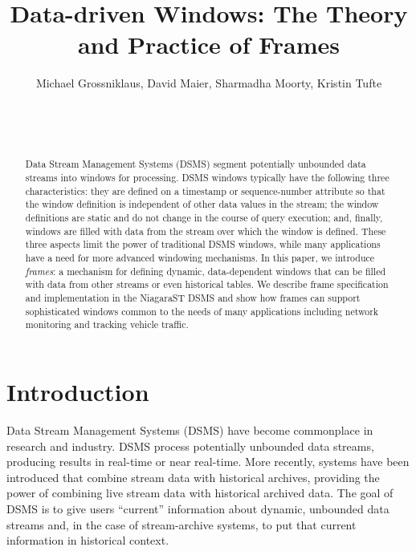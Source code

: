 \documentclass{vldb}
\newcommand{\dquote}[1]{``#1''}
\begin{document}
\thispagestyle{empty}
\pagestyle{empty}

\title{Data-driven Windows: The Theory and Practice of Frames}


\author{%
\alignauthor
Michael Grossniklaus, David Maier, Sharmadha Moorty, Kristin Tufte\\
       \\
       \\
       \\
}



\maketitle

\begin{abstract}
Data Stream Management Systems (DSMS) segment potentially unbounded data streams into windows for processing. DSMS windows typically have the following three characteristics: they are defined on a timestamp or sequence-number attribute so that the window definition is independent of other data values in the stream; the window definitions are static and do not change in the course of query execution; and, finally, windows are filled with data from the stream over which the window is defined. These three aspects limit the power of traditional DSMS windows, while many applications have a need for more advanced windowing mechanisms. In this paper, we introduce \emph{frames}: a mechanism for defining dynamic, data-dependent windows that can be filled with data from other streams or even historical tables. We describe frame specification and implementation in the NiagaraST DSMS and show how frames can support sophisticated windows common to the needs of many applications including network monitoring and tracking vehicle traffic. 
\end{abstract}

\section{Introduction}
\label{sec:introduction}

Data Stream Management Systems (DSMS) have become commonplace in research and industry. DSMS process potentially unbounded data streams, producing results in real-time or near real-time. More recently, systems have been introduced that combine stream data with historical archives, providing the power of combining live stream data with historical archived data. The goal of DSMS is to give users \dquote{current} information about dynamic, unbounded data streams and, in the case of stream-archive systems, to put that current information in historical context.
 
\end{document}
